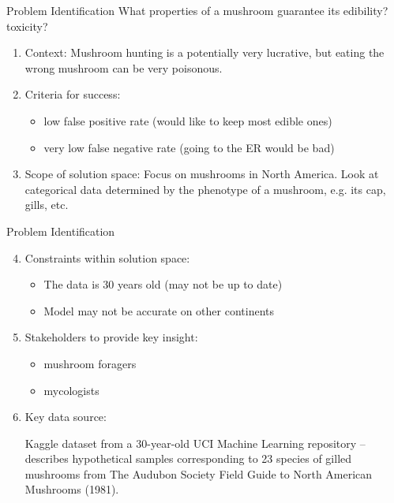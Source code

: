 \documentclass{beamer}
\begin{document}
\begin{frame}{Problem Identification}
What properties of a mushroom guarantee its edibility? toxicity?
\begin{enumerate}
\item Context: 
Mushroom hunting is a potentially very lucrative, but
eating the wrong mushroom can be very poisonous.
\item Criteria for success:
\begin{itemize}
\item low false positive rate (would like to keep most edible ones)
\item very low false negative rate (going to the ER would be bad)
\end{itemize}
\item Scope of solution space: Focus on mushrooms in North
America. Look at categorical data determined by the phenotype of a
mushroom, e.g. its cap, gills, etc.
\end{enumerate}
\end{frame}

\begin{frame}{Problem Identification}
\begin{enumerate}
\setcounter{enumi}{3}
\item Constraints within solution space:
\begin{itemize}
\item The data is 30 years old (may not be up to date)
\item Model may not be accurate on other continents
\end{itemize}
\item Stakeholders to provide key insight:
\begin{itemize}
\item mushroom foragers
\item mycologists
\end{itemize}
\item Key data source:

Kaggle dataset from a 30-year-old UCI Machine Learning repository
-- describes hypothetical samples corresponding to 23 species of
gilled mushrooms from The Audubon Society Field Guide to North
American Mushrooms (1981).
\end{enumerate}
\end{frame}
\end{document}
